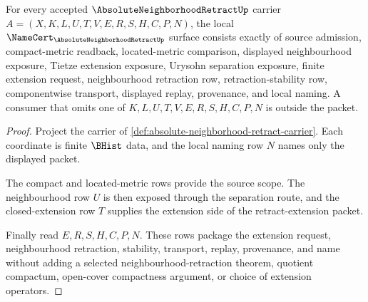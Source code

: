 \begin{theorem}\label{thm:absolute-neighborhood-retract-namecert-obligations}
For every accepted $\AbsoluteNeighborhoodRetractUp$ carrier $A=(X,K,L,U,T,V,E,R,S,H,C,P,N)$, the local $\NameCert_{\AbsoluteNeighborhoodRetractUp}$ surface consists exactly of source admission, compact-metric readback, located-metric comparison, displayed neighbourhood exposure, Tietze extension exposure, Urysohn separation exposure, finite extension request, neighbourhood retraction row, retraction-stability row, componentwise transport, displayed replay, provenance, and local naming. A consumer that omits one of $K,L,U,T,V,E,R,S,H,C,P,N$ is outside the packet.
\end{theorem}
\begin{proof}
Project the carrier of \autoref{def:absolute-neighborhood-retract-carrier}. Each coordinate is finite $\BHist$ data, and the local naming row $N$ names only the displayed packet.

The compact and located-metric rows provide the source scope. The neighbourhood row $U$ is then exposed through the separation route, and the closed-extension row $T$ supplies the extension side of the retract-extension packet.

Finally read $E,R,S,H,C,P,N$. These rows package the extension request, neighbourhood retraction, stability, transport, replay, provenance, and name without adding a selected neighbourhood-retraction theorem, quotient compactum, open-cover compactness argument, or choice of extension operators.
\end{proof}

